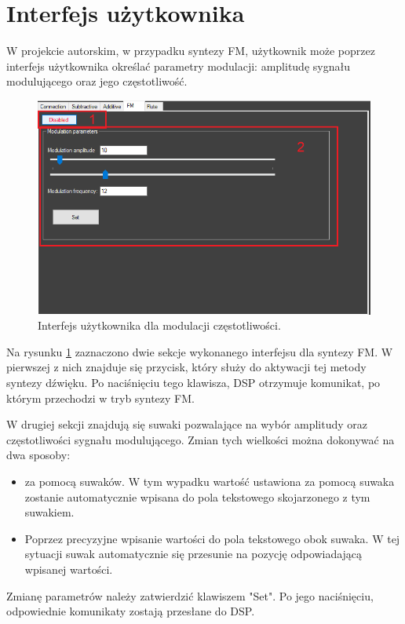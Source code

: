 \section{Interfejs użytkownika}
W projekcie autorskim, w przypadku syntezy FM, użytkownik może poprzez interfejs użytkownika określać parametry modulacji: amplitudę sygnału modulującego oraz jego częstotliwość.
\begin{figure}[H]
	\centering
	\includegraphics[width=12cm]{grafiki/fm_interface}
	\captionsetup{justification=centering}
	\caption{Interfejs użytkownika dla modulacji częstotliwości.}
	\label{rys:fm_interface}
\end{figure}
Na rysunku \ref{rys:fm_interface} zaznaczono dwie sekcje wykonanego interfejsu dla syntezy FM. W pierwszej z nich znajduje się przycisk, który służy do aktywacji tej metody syntezy dźwięku. Po naciśnięciu tego klawisza, DSP otrzymuje komunikat, po którym przechodzi w tryb syntezy FM.

W drugiej sekcji znajdują się suwaki pozwalające na wybór amplitudy oraz częstotliwości sygnału modulującego. Zmian tych wielkości można dokonywać na dwa sposoby:
\begin{itemize}
	\item za pomocą suwaków. W tym wypadku wartość ustawiona za pomocą suwaka zostanie automatycznie wpisana do pola tekstowego skojarzonego z tym suwakiem.
	\item Poprzez precyzyjne wpisanie wartości do pola tekstowego obok suwaka. W tej sytuacji suwak automatycznie się przesunie na pozycję odpowiadającą wpisanej wartości.
\end{itemize}
Zmianę parametrów należy zatwierdzić klawiszem "Set". Po jego naciśnięciu, odpowiednie komunikaty zostają przesłane do DSP.
